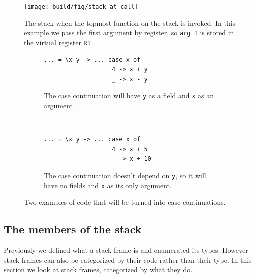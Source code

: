 \begin{figure}
\begin{mdframed}
  \texttt{[image: build/fig/stack\_at\_call]}
  \caption{The stack when the topmost function on the stack is invoked.  In
    this example we pass the first argument by register, so \texttt{arg 1} is
    stored in the virtual register \texttt{R1}}
  \label{fig:stack_at_call}
\end{mdframed}
\end{figure}

\begin{figure}
\begin{mdframed}
        \begin{subfigure}[t]{0.5\textwidth}
          \begin{verbatim}
... = \x y -> ... case x of
                   4 -> x + y
                   _ -> x - y
          \end{verbatim}
          \caption{The case continuation will have \texttt{y} as a field
and \texttt{x} as an argument}
        \end{subfigure}
    ~ %
        \begin{subfigure}[t]{0.5\textwidth}
          \begin{verbatim}
... = \x y -> ... case x of
                   4 -> x + 5
                   _ -> x + 10
          \end{verbatim}
          \caption{The case continuation doesn't depend on \texttt{y}, so it
            will have no fields and \texttt{x} as its only argument.}
          \label{fig:no_fields}
        \end{subfigure}
  \caption{Two examples of code that will be turned into case
continuations.}
  \label{fig:field_and_arguments}
\end{mdframed}
\end{figure}

\subsection{The members of the stack} \label{sec:members_of_stack}


Previously we defined what a stack frame is and enumerated
its types. However stack frames can also be categorized by their
code rather than their type. In this
section we look at stack frames, categorized by what they do.

